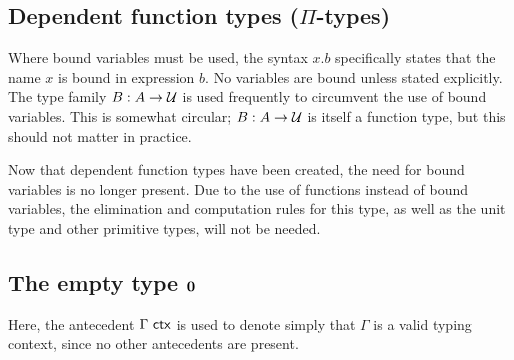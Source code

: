 \documentclass[UKenglish, 11pt, a4paper, parskip=half]{scrbook}
\begin{document}
\subsection{Dependent function types (\texorpdfstring{$\Pi$}{Π}-types)}

Where bound variables must be used, the syntax \( x.b \) specifically states that the name \( x \) is bound in expression \( b \).
No variables are bound unless stated explicitly.
The type family \( B:A \to \mathcal{U} \) is used frequently to circumvent the use of bound variables.
This is somewhat circular; \( B:A \to \mathcal{U} \) is itself a function type, but this should not matter in practice.


Now that dependent function types have been created, the need for bound variables is no longer present.
Due to the use of functions instead of bound variables, the elimination and computation rules for this type, as well as the unit type and other primitive types, will not be needed.

\subsection{The empty type \texorpdfstring{$\mathbf{0}$}{0}}
Here, the antecedent \( \Gamma\ \mathsf{ctx} \) is used to denote simply that \( \Gamma \) is a valid typing context, since no other antecedents are present.
\end{document}
